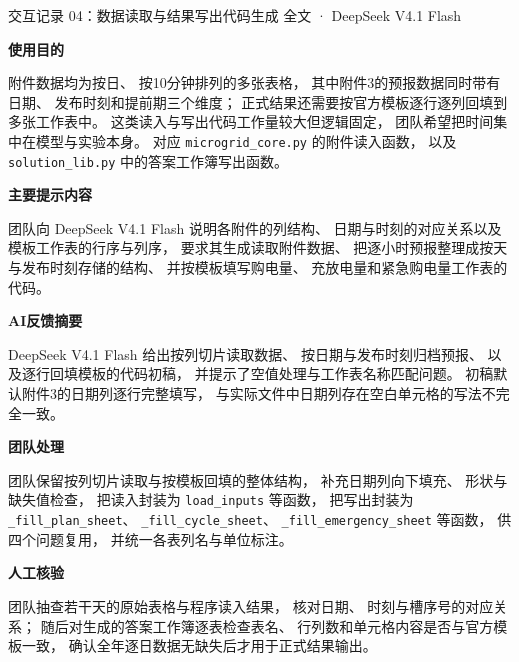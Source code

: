 \documentclass[UTF8,a4paper,11pt]{ctexart}
\newcommand{\recorditem}[1]{%
    \par\vspace{0.28em}
    \noindent\textbf{#1}\quad
}
\begin{document}
\begin{recordbox}
{交互记录 04：数据读取与结果写出代码生成}
{全文 · DeepSeek V4.1 Flash}

\recorditem{使用目的}
附件数据均为按日、
按10分钟排列的多张表格，
其中附件3的预报数据同时带有日期、
发布时刻和提前期三个维度；
正式结果还需要按官方模板逐行逐列回填到多张工作表中。
这类读入与写出代码工作量较大但逻辑固定，
团队希望把时间集中在模型与实验本身。
对应 \texttt{microgrid\_core.py} 的附件读入函数，
以及 \texttt{solution\_lib.py} 中的答案工作簿写出函数。

\recorditem{主要提示内容}
团队向 DeepSeek V4.1 Flash 说明各附件的列结构、
日期与时刻的对应关系以及模板工作表的行序与列序，
要求其生成读取附件数据、
把逐小时预报整理成按天与发布时刻存储的结构、
并按模板填写购电量、
充放电量和紧急购电量工作表的代码。

\recorditem{AI反馈摘要}
DeepSeek V4.1 Flash 给出按列切片读取数据、
按日期与发布时刻归档预报、
以及逐行回填模板的代码初稿，
并提示了空值处理与工作表名称匹配问题。
初稿默认附件3的日期列逐行完整填写，
与实际文件中日期列存在空白单元格的写法不完全一致。

\recorditem{团队处理}
团队保留按列切片读取与按模板回填的整体结构，
补充日期列向下填充、
形状与缺失值检查，
把读入封装为 \texttt{load\_inputs} 等函数，
把写出封装为 \texttt{\_fill\_plan\_sheet}、
\texttt{\_fill\_cycle\_sheet}、
\texttt{\_fill\_emergency\_sheet} 等函数，
供四个问题复用，
并统一各表列名与单位标注。

\recorditem{人工核验}
团队抽查若干天的原始表格与程序读入结果，
核对日期、
时刻与槽序号的对应关系；
随后对生成的答案工作簿逐表检查表名、
行列数和单元格内容是否与官方模板一致，
确认全年逐日数据无缺失后才用于正式结果输出。
\end{recordbox}
\end{document}
